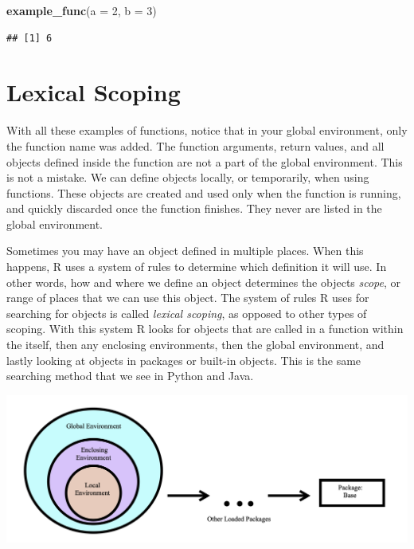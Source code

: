 \documentclass[
]{book}
\newenvironment{Shaded}{\begin{snugshade}}{\end{snugshade}}
\newcommand{\DataTypeTok}[1]{\textcolor[rgb]{0.13,0.29,0.53}{#1}}
\newcommand{\DecValTok}[1]{\textcolor[rgb]{0.00,0.00,0.81}{#1}}
\newcommand{\KeywordTok}[1]{\textcolor[rgb]{0.13,0.29,0.53}{\textbf{#1}}}
\newcommand{\NormalTok}[1]{#1}
\begin{document}
\begin{Shaded}
\begin{Highlighting}[]
\KeywordTok{example_func}\NormalTok{(}\DataTypeTok{a =} \DecValTok{2}\NormalTok{, }\DataTypeTok{b =} \DecValTok{3}\NormalTok{)}
\end{Highlighting}
\end{Shaded}

\begin{verbatim}
## [1] 6
\end{verbatim}

\hypertarget{lexical-scoping}{%
\section{Lexical Scoping}\label{lexical-scoping}}

With all these examples of functions, notice that in your global environment, only the function name was added. The function arguments, return values, and all objects defined inside the function are not a part of the global environment. This is not a mistake. We can define objects locally, or temporarily, when using functions. These objects are created and used only when the function is running, and quickly discarded once the function finishes. They never are listed in the global environment.

Sometimes you may have an object defined in multiple places. When this happens, R uses a system of rules to determine which definition it will use. In other words, how and where we define an object determines the objects \emph{scope}, or range of places that we can use this object. The system of rules R uses for searching for objects is called \emph{lexical scoping}, as opposed to other types of scoping. With this system R looks for objects that are called in a function within the itself, then any enclosing environments, then the global environment, and lastly looking at objects in packages or built-in objects. This is the same searching method that we see in Python and Java.

\begin{center}\includegraphics[width=36.5in]{images/Scoping} \end{center}
\end{document}
